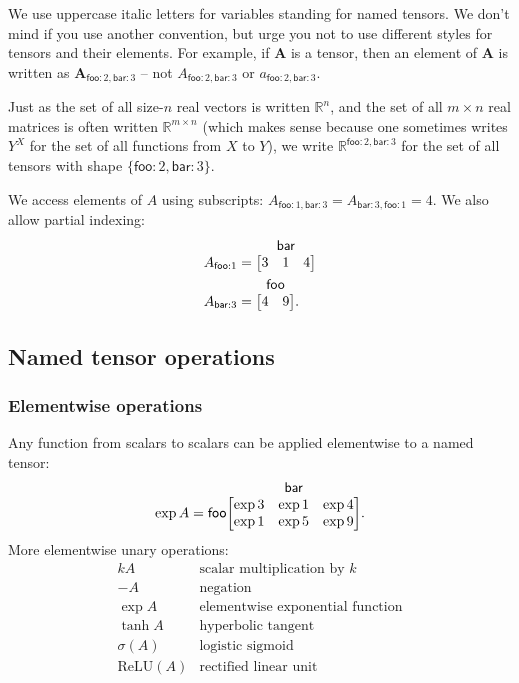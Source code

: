 \documentclass{article}
\makeatletter
\newcommand{\name}[1]{\mathsf{#1}}
\newcommand{\tuple}[1]{\{ #1\}}
\newcommand{\nmatrix}[3]{\name{#1}\begin{array}[b]{@{}c@{}}\name{#2}\\\begin{bmatrix}#3\end{bmatrix}\end{array}}
\makeatother
\begin{document}
We use uppercase italic letters for variables standing for named tensors. We don't mind if you use another convention, but urge you not to use different styles for tensors and their elements. For example, if $\mathbf{A}$ is a tensor, then an element of $\mathbf{A}$ is written as $\mathbf{A}_{\name{foo}:2, \name{bar}:3}$ -- 
not $A_{\name{foo}:2,\name{bar}:3}$ or $a_{\name{foo}:2,\name{bar}:3}$.

Just as the set of all size-$n$ real vectors is written $\mathbb{R}^n$, and the set of all $m\times n$ real matrices is often written $\mathbb{R}^{m \times n}$ (which makes sense because one sometimes writes $Y^X$ for the set of all functions from $X$ to $Y$), we write $\mathbb{R}^{\name{foo}: 2, \name{bar}: 3}$ for the set of all tensors with shape $\tuple{\name{foo}:2, \name{bar}:3}$.

We access elements of $A$ using subscripts: $A_{\name{foo}: 1, \name{bar}: 3} = A_{\name{bar}: 3, \name{foo}: 1} = 4$.
We also allow partial indexing:
\begin{align*}
A_{\name{foo}:1} &= \nmatrix{}{bar}{
  3 & 1 & 4
}
\\
A_{\name{bar}:3} &= \nmatrix{}{foo}{
  4 & 9
}.
\end{align*}

\subsection{Named tensor operations}
\label{sec:operations}

\subsubsection{Elementwise operations}

Any function from scalars to scalars can be applied elementwise to a named tensor:
\begin{equation*}
\exp A = \nmatrix{foo}{bar}{
  \exp 3 & \exp 1 & \exp 4 \\
  \exp 1 & \exp 5 & \exp 9
}.
\end{equation*}
More elementwise unary operations:
\[\begin{array}{cl}
kA & \text{scalar multiplication by $k$} \\
-A & \text{negation} \\
\exp A & \text{elementwise exponential function} \\
\tanh A & \text{hyperbolic tangent} \\
\sigma(A) & \text{logistic sigmoid} \\
\text{ReLU}(A) & \text{rectified linear unit}
\end{array}\]
\end{document}

